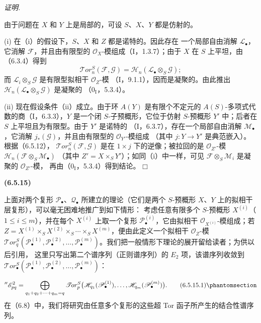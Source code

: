 \documentclass[UTF8,fontset=none,11pt,oneside,openany]{ctexbook}
\providecommand{\square}{\mdlgwhtsquare}
\newenvironment{env}[1][]{%
  \par\medskip\noindent\textbf{(#1)}\ %
}{\par}
\newenvironment{proof}{%
  \par\smallskip\noindent\textit{证明.}\ %
}{\hfill$\square$\par}
\newcommand{\oldpage}[2][]{%
  \hypertarget{ega-source-page-#1-#2}{}%
  \marginnote{\scriptsize\textbf{#1}~|~#2}\ignorespaces}
\let\EGAOriginalLabel\label
\renewcommand{\label}[1]{\phantomsection\EGAOriginalLabel{#1}}
\begin{document}
\begin{proof}
由于问题在 $X$ 和 $Y$ 上是局部的，可设 $S$、$X$、$Y$ 都是仿射的。

\textnormal{(i)} 在（i）的假设下，$S$、$X$ 和 $Z$ 都是诺特的。因此存在
一个局部自由消解 $\mathscr L_\bullet$，它消解 $\mathscr F$，并且由有限型的
$\mathscr O_X$-模组成（I，1.3.7）；由于 $X$ 在 $S$ 上平坦，由（6.3.4）得到
\[
  \mathscr{T}\!or_n^S(\mathscr F,\mathscr G)
  =\mathscr H_n(\mathscr L_\bullet\otimes_S\mathscr G);
\]
而 $\mathscr L_i\otimes_S\mathscr G$ 是有限型拟相干 $\mathscr O_Z$-模
（I，9.1.1），因而是凝聚的。由此推出
$\mathscr H_n(\mathscr L_\bullet\otimes_S\mathscr G)$ 是凝聚的
（$0_{\mathrm I}$，5.3.4）。

\textnormal{(ii)} 现在假设条件（ii）成立。由于环 $A(Y)$ 是有限个不定元的
$A(S)$-多项式代数的商（I，6.3.3），$Y$ 是一个闭 $S$-子预概形，它位于仿射
$S$-预概形 $Y'$ 中；后者在 $S$ 上平坦且为有限型。由于 $Y'$ 是诺特的
（I，6.3.7），存在一个局部自由消解 $\mathscr M_\bullet$，它消解
$j_*(\mathscr G)$，并且由有限型的 $\mathscr O_{Y'}$-模组成
（其中 $j:Y\to Y'$ 是典范嵌入）。根据（6.5.12），
$\mathscr{T}\!or_n^S(\mathscr F,\mathscr G)$ 是在 $1\times j$ 下的逆像；被拉回的是
$\mathscr O_{Z'}$-模 $\mathscr H_n(\mathscr F\otimes_S\mathscr M_\bullet)$
（其中 $Z'=X\times_S Y'$）；如同（i）中一样，可见
$\mathscr F\otimes_S\mathscr M_i$ 是凝聚的 $\mathscr O_{Z'}$-模，
再由（$0_{\mathrm I}$，5.3.4）得到结论。
\end{proof}
\begin{env}[6.5.15]
上面对两个复形 $\mathscr P_\bullet$、$\mathscr Q_\bullet$ 所建立的理论（它们是两个
$S$-预概形 $X$、$Y$ 上的拟相干层复形），可以毫无困难地推广到如下情形：
考虑任意有限多个 $S$-预概形 $X^{(i)}$（$1\leqslant i\leqslant m$），并在每个
$X^{(i)}$ 上取一个复形 $\mathscr P_\bullet^{(i)}$，它由拟相干
$\mathscr O_{X^{(i)}}$-模组成；若
$Z=X^{(1)}\times_S X^{(2)}\times_S\cdots\times_S X^{(m)}$，便由此定义一个拟相干
$\mathscr O_Z$-模
$\mathscr{T}\!or_q^S(\mathscr P_\bullet^{(1)},\mathscr P_\bullet^{(2)},
\ldots,\mathscr P_\bullet^{(m)})$。我们把一般情形下理论的展开留给读者；为供以后引用，
这里只写出第二个谱序列（正则谱序列）的 $E_2$ 项，该谱序列收敛到
$\mathscr{T}\!or_\bullet^S(\mathscr P_\bullet^{(1)},
\mathscr P_\bullet^{(2)},\ldots,\mathscr P_\bullet^{(m)})$：

\oldpage[III]{153}

\[
  ''\mathscr E_{pq}^2
  =\bigoplus_{q_1+q_2+\cdots+q_m=q}
   \mathscr{T}\!or_p^S
   \bigl(\mathscr H_{q_1}(\mathscr P_\bullet^{(1)}),\ldots,
         \mathscr H_{q_m}(\mathscr P_\bullet^{(m)})\bigr).
  \tag{6.5.15.1}\label{III.6.5.15.1-fr}
\]
在（6.8）中，我们将研究由任意多个复形的这些超 Tor 函子所产生的结合性谱序列。
\end{env}
\end{document}
